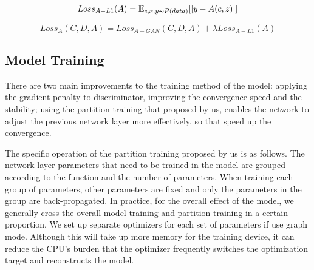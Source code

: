 \begin{equation}
    Loss_{A-L1}(A)=
    \mathbb{E}_{c,x,y\thicksim P(data)}[|y-A(c,z)|]
    \label{loss_a_l1}
\end{equation}

\begin{equation}
    Loss_{A}(C,D,A)=
    Loss_{A-GAN}(C,D,A)+
    \lambda Loss_{A-L1}(A)
    \label{loss_u}
\end{equation}

\subsection{Model Training}
There are two main improvements to the training method of the model:
    applying the gradient penalty to discriminator,
    improving the convergence speed and the stability;
    using the partition training that proposed by us,
    enables the network to adjust the previous network layer more effectively,
    so that speed up the convergence.

The specific operation of the partition training proposed by us is as follows.
The network layer parameters that need to be trained in the model are grouped according to the function and the number of parameters.
When training each group of parameters,
    other parameters are fixed and only the parameters in the group are back-propagated.
In practice, for the overall effect of the model,
    we generally cross the overall model training and partition training in a certain proportion.
We set up separate optimizers for each set of parameters if use graph mode.
Although this will take up more memory for the training device,
    it can reduce the CPU's burden that the optimizer frequently switches the optimization target and reconstructs the model.